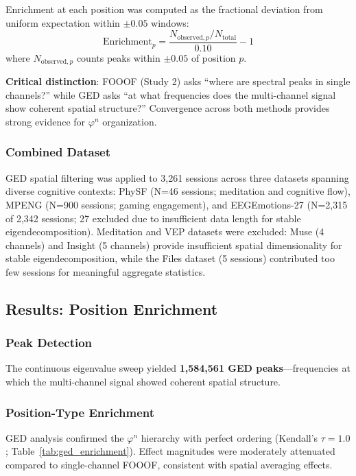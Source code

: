 \documentclass[11pt,a4paper]{article}
\newcommand{\phisym}{\varphi}
\begin{document}
Enrichment at each position was computed as the fractional deviation from uniform expectation within $\pm 0.05$ windows:
\begin{equation}
\text{Enrichment}_p = \frac{N_{\text{observed},p} / N_{\text{total}}}{0.10} - 1
\end{equation}
where $N_{\text{observed},p}$ counts peaks within $\pm 0.05$ of position $p$.

\textbf{Critical distinction}: FOOOF (Study 2) asks ``where are spectral peaks in single channels?'' while GED asks ``at what frequencies does the multi-channel signal show coherent spatial structure?'' Convergence across both methods provides strong evidence for $\phisym^n$ organization.

\subsubsection{Combined Dataset}
GED spatial filtering was applied to 3,261 sessions across three datasets spanning diverse cognitive contexts: PhySF (N=46 sessions; meditation and cognitive flow), MPENG (N=900 sessions; gaming engagement), and EEGEmotions-27 (N=2,315 of 2,342 sessions; 27 excluded due to insufficient data length for stable eigendecomposition). Meditation and VEP datasets were excluded: Muse (4 channels) and Insight (5 channels) provide insufficient spatial dimensionality for stable eigendecomposition, while the Files dataset (5 sessions) contributed too few sessions for meaningful aggregate statistics.

\subsection{Results: Position Enrichment}

\subsubsection{Peak Detection}
The continuous eigenvalue sweep yielded \textbf{1,584,561 GED peaks}---frequencies at which the multi-channel signal showed coherent spatial structure.

\subsubsection{Position-Type Enrichment}
GED analysis confirmed the $\phisym^n$ hierarchy with perfect ordering (Kendall's $\tau = 1.0$; Table~\ref{tab:ged_enrichment}). Effect magnitudes were moderately attenuated compared to single-channel FOOOF, consistent with spatial averaging effects.
\end{document}
